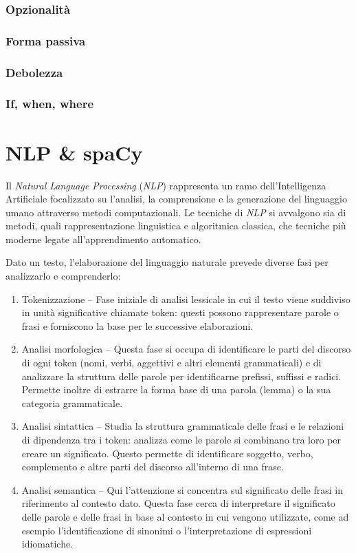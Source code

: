 \documentclass[12pt]{report}
\newcommand{\nlp}{\textsl{NLP}\xspace}
\begin{document}
\subsection{Opzionalità}
\subsection{Forma passiva}
\subsection{Debolezza}
\subsection{If, when, where}






\chapter{NLP \& spaCy}
\label{sec:nlp}
Il \textit{Natural Language Processing} (\nlp) rappresenta un ramo dell'Intelligenza Artificiale focalizzato su l'analisi, la comprensione e la generazione del linguaggio umano attraverso metodi computazionali. Le tecniche di \nlp si avvalgono sia di metodi, quali rappresentazione linguistica e algoritmica classica, che tecniche più moderne legate all'apprendimento automatico.

Dato un testo, l'elaborazione del linguaggio naturale prevede diverse fasi per analizzarlo e comprenderlo:

\begin{enumerate}
\item \textsf{Tokenizzazione} -- Fase iniziale di analisi lessicale in cui il testo viene suddiviso in unità significative chiamate token: questi possono rappresentare parole o frasi e forniscono la base per le successive elaborazioni.
\item \textsf{Analisi morfologica} -- Questa fase si occupa di identificare le parti del discorso di ogni token (nomi, verbi, aggettivi e altri elementi grammaticali) e di analizzare la struttura delle parole per identificarne prefissi, suffissi e radici. Permette inoltre di estrarre la forma base di una parola (lemma) o la sua categoria grammaticale.
\item \textsf{Analisi sintattica} -- Studia la struttura grammaticale delle frasi e le relazioni di dipendenza tra i token: analizza come le parole si combinano tra loro per creare un significato. Questo permette di identificare soggetto, verbo, complemento e altre parti del discorso all'interno di una frase.
\item \textsf{Analisi semantica} -- Qui l'attenzione si concentra sul significato delle frasi in riferimento al contesto dato. Questa fase cerca di interpretare il significato delle parole e delle frasi in base al contesto in cui vengono utilizzate, come ad esempio l'identificazione di sinonimi o l'interpretazione di espressioni idiomatiche.
\end{enumerate}
\end{document}
